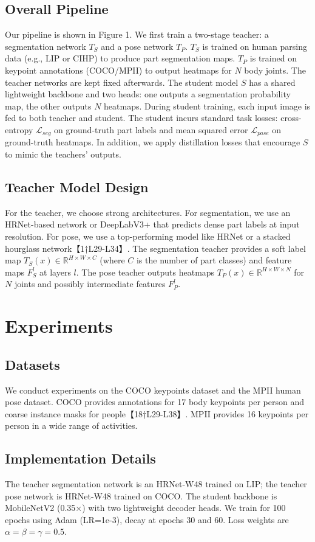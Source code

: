 \documentclass{article}
\begin{document}
\subsection{Overall Pipeline}
Our pipeline is shown in Figure 1. We first train a two-stage teacher: a segmentation network $T_S$ and a pose network $T_P$. $T_S$ is trained on human parsing data (e.g., LIP or CIHP) to produce part segmentation maps. $T_P$ is trained on keypoint annotations (COCO/MPII) to output heatmaps for $N$ body joints. The teacher networks are kept fixed afterwards. The student model $S$ has a shared lightweight backbone and two heads: one outputs a segmentation probability map, the other outputs $N$ heatmaps. During student training, each input image is fed to both teacher and student. The student incurs standard task losses: cross-entropy $\mathcal{L}_{seg}$ on ground-truth part labels and mean squared error $\mathcal{L}_{pose}$ on ground-truth heatmaps. In addition, we apply distillation losses that encourage $S$ to mimic the teachers’ outputs.

\subsection{Teacher Model Design}
For the teacher, we choose strong architectures. For segmentation, we use an HRNet-based network or DeepLabV3+ that predicts dense part labels at input resolution. For pose, we use a top-performing model like HRNet or a stacked hourglass network【1†L29-L34】. The segmentation teacher provides a soft label map $T_S(x)\in \mathbb{R}^{H\times W\times C}$ (where $C$ is the number of part classes) and feature maps $F_S^l$ at layers $l$. The pose teacher outputs heatmaps $T_P(x)\in \mathbb{R}^{H\times W\times N}$ for $N$ joints and possibly intermediate features $F_P^l$.

\section{Experiments}
\subsection{Datasets}
We conduct experiments on the COCO keypoints dataset and the MPII human pose dataset. COCO provides annotations for 17 body keypoints per person and coarse instance masks for people【18†L29-L38】. MPII provides 16 keypoints per person in a wide range of activities. 

\subsection{Implementation Details}
The teacher segmentation network is an HRNet-W48 trained on LIP; the teacher pose network is HRNet-W48 trained on COCO. The student backbone is MobileNetV2 (0.35×) with two lightweight decoder heads. We train for 100 epochs using Adam (LR=1e-3), decay at epochs 30 and 60. Loss weights are $\alpha=\beta=\gamma=0.5$.
\end{document}
